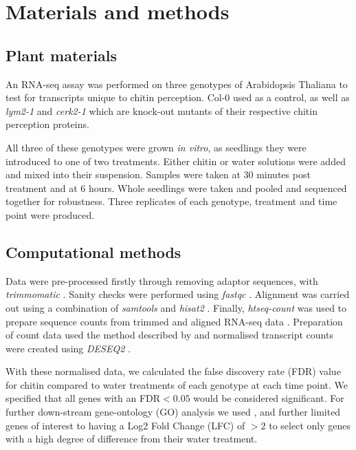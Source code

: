 \documentclass[../main.tex]{subfiles}
\begin{document}
\section{Materials and methods}

\subsection{Plant materials}
An RNA-seq assay was performed on three genotypes of Arabidopsis Thaliana to
test for transcripts unique to chitin perception. Col-0 used as a control,
as well as \textit{lym2-1} and \textit{cerk2-1} which are knock-out mutants of
their respective chitin perception proteins. 

All three of these genotypes were grown \textit{in vitro}, as seedlings they
were introduced to one of two treatments. Either chitin or water solutions were
added and mixed into their suspension. Samples were taken at 30 minutes post
treatment and at 6 hours. Whole seedlings were taken and pooled and sequenced
together for robustness. Three replicates of each genotype, treatment and time
point were produced.


\subsection{Computational methods}

Data were pre-processed firstly through removing adaptor sequences, with
\textit{trimmomatic} \cite{bolgerTrimmomaticFlexibleTrimmer2014}. Sanity checks
were performed using \textit{fastqc} \cite{andrewsBabrahamBioinformaticsFastQC}.
Alignment was carried out using a combination of \textit{samtools} and
\textit{hisat2} \cite{liSequenceAlignmentMap2009}. Finally, \textit{htseq-count}
was used to prepare sequence counts from trimmed and aligned RNA-seq data
\cite{kimHISATFastSpliced2015}. Preparation of count data used the method
described by \citet{loveModeratedEstimationFold2014a} and normalised transcript
counts were created using \textit{DESEQ2}
\cite{piperCountNormalizationDESeq22017}.

With these normalised data, we calculated the false discovery rate (FDR) value
for chitin compared to water treatments of each genotype at each time point. We
specified that all genes with an FDR$< 0.05$ would be considered significant.
For further down-stream gene-ontology (GO) analysis we used
\cite{klopfensteinGOATOOLSPythonLibrary2018}, and further limited genes of
interest to having a Log2 Fold Change (LFC) of $>2$ to select only genes with a
high degree of difference from their water treatment.
\end{document}
